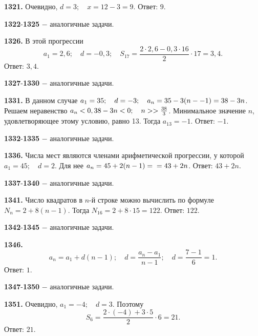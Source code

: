 \textbf{1321.} Очевидно, $d=3;\quad x=12-3=9$. \newline \null \hspace*{\fill} Ответ: $9$. 

\textbf{1322}-\textbf{1325} $-$ аналогичные задачи.

\textbf{1326.} В этой прогрессии $$a_1=2,6;\quad d=-0,3;\quad S_{17}=\frac{2\cdot2,6-0,3\cdot16}{2}\cdot17=3,4.$$ \newline \null \hspace*{\fill} Ответ: $3,4$. 

\textbf{1327}-\textbf{1330} $-$ аналогичные задачи.

\textbf{1331.} В данном случае $a_1=35;\quad d=-3;\quad a_n=35-3(n-\linebreak-1)=38-3n$. Решаем неравенство $a_n<0,38-3n<0;\quad n>\linebreak>\frac{38}{3}$.  Минимальное 
значение $n$, удовлетворяющее этому условию, равно 13. Тогда $a_{13}=-1$. \newline \null \hspace*{\fill} Ответ: $-1$. 

\textbf{1332}-\textbf{1335} $-$ аналогичные задачи.

\textbf{1336.} Числа мест являются членами арифметической прогрессии, у которой $a_1=45;\quad d=2$. Для нее $a_n=45+2(n-1)=\newline=43+2n$. \newline \null \hspace*{\fill} Ответ: $43+2n$. 

\textbf{1337}-\textbf{1340} $-$ аналогичные задачи.

\textbf{1341.}  Число квадратов в  $n$-й строке можно вычислить по формуле $N_n=2+8(n-1)$. Тогда $N_{16}=2+8\cdot15=122$. \newline \null \hspace*{\fill} Ответ: $122$.

\textbf{1342}-\textbf{1345} $-$ аналогичные задачи.

\newpage \textbf{1346.} $$a_n=a_1+d(n-1);\quad d=\frac{a_n-a_1}{n-1};\quad d=\frac{7-1}{6}=1.$$ \newline \null \hspace*{\fill} Ответ: $1$.

\textbf{1347}-\textbf{1350} $-$ аналогичные задачи.

\textbf{1351.} Очевидно, $a_1=-4;\quad d=3$. Поэтому $$S_6=\frac{2\cdot(-4)+3\cdot5}{2}\cdot6=21.$$ \newline \null \hspace*{\fill} Ответ: $21$.

